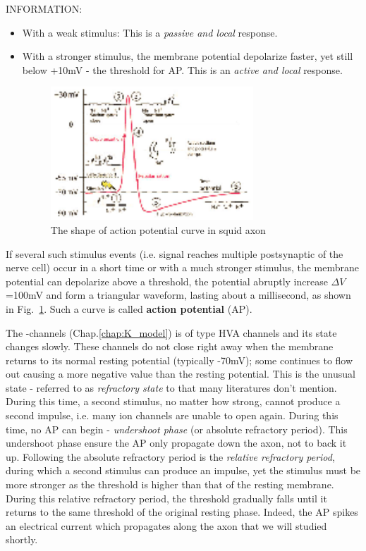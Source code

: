 INFORMATION:
\begin{itemize}
\item With a weak stimulus: This is a {\it passive and local} response. 


\item With a stronger stimulus, the membrane potential depolarize faster,
  yet still below +10mV - the threshold for AP. This is an {\it active and
  local} response.

\begin{figure}[hbt]
 \centerline{\includegraphics[height=5cm]{./images/action_potential.eps}}
 \caption{The shape of action potential curve in squid axon}
\label{fig:action_potential}
\end{figure}
\end{itemize}

If several such stimulus events (i.e. signal reaches multiple postsynaptic of
the nerve cell) occur in a short time or with a much stronger stimulus, the
membrane potential can depolarize above a threshold, the potential abruptly
increase $\Delta V$=100mV and form a triangular waveform, lasting about a
millisecond, as shown in Fig.~\ref{fig:action_potential}. Such a curve is called
{\bf action potential} (AP).

The -channels (Chap.\ref{chap:K_model}) is of type HVA channels and its
state changes slowly. These channels do not close right away when the membrane
returns to its normal resting potential (typically -70mV); some 
continues to flow out causing a more negative value than the resting potential.
This is the unusual state - referred to as {\it refractory state} to that many
literatures don't mention. During this time, a second stimulus, no matter how
strong, cannot produce a second impulse, i.e. many ion channels are unable to
open again.
During this time, no AP can begin - {\it undershoot phase} (or absolute
refractory period).  This undershoot phase ensure the AP only propagate down the
axon, not to back it up.  Following the absolute refractory period is the {\it
relative refractory period}, during which a second stimulus can produce an
impulse, yet the stimulus must be more stronger as the threshold is higher than
that of the resting membrane. During this relative refractory period, the
threshold gradually falls until it returns to the same threshold of the original
resting phase.  Indeed, the AP spikes an electrical current which propagates
along the axon that we will studied shortly.


